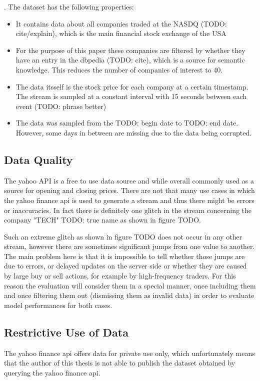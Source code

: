 . The dataset has the following properties:
\begin{itemize}
	\item It contains data about all companies traded at the NASDQ (TODO: cite/explain), which is the main financial stock exchange of the USA
	\item For the purpose of this paper these companies are filtered by whether they have an entry in the dbpedia (TODO: cite), which is a source for semantic knowledge. This reduces the number of companies of interest to 40.
	\item The data itsself is the stock price for each company at a certain timestamp. The stream is sampled at a constant interval with 15 seconds between each event (TODO: phrase better)
	\item The data was sampled from the TODO: begin date to  TODO: end date. However, some days in between are missing due to the data being corrupted.
\end{itemize}

\subsection{Data Quality}
The yahoo API is a free to use data source and while overall commonly used as a source for opening and closing prices. There are not that many use cases in which the yahoo finance api is used to generate a stream and thus there might be errors or inaccuracies. In fact there is definitely one glitch in the stream concerning the company "TECH" TODO: true name as shown in figure TODO.

Such an extreme glitch as shown in figure TODO does not occur in any other stream, however there are sometimes significant jumps from one value to another. The main problem here is that it is impossible to tell whether those jumps are due to errors, or delayed updates on the server side or whether they are caused by large buy or sell actions, for example by high-frequency traders. For this reason the evaluation will consider them in a special manner, once including them and once filtering them out (dismissing them as invalid data) in order to evaluate model performances for both cases. 

\subsection{Restrictive Use of Data}
The yahoo finance api offers data for private use only, which unfortunately means that the author of this thesis is not able to publish the dataset obtained by querying the yahoo finance api.


